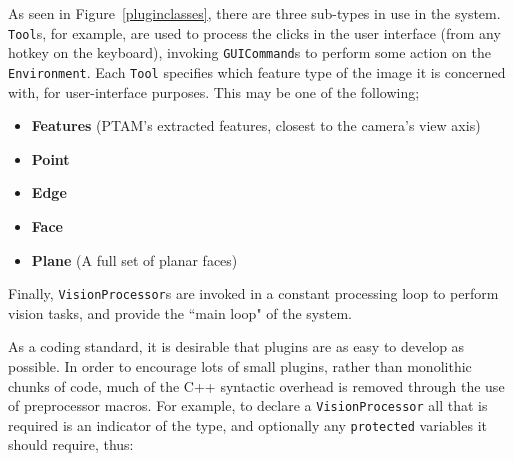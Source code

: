 \documentclass[a4paper,10pt]{article}
\begin{document}
As seen in Figure~\ref{pluginclasses}, there are three sub-types in use in the system. \texttt{Tool}s, for example, are used to process the clicks in the user interface (from any hotkey on the keyboard), invoking \texttt{GUICommand}s to perform some action on the \texttt{Environment}. Each \texttt{Tool} specifies which feature type of the image it is concerned with, for user-interface purposes. This may be one of the following;
\begin{itemize}
\item{\textbf{Features} (PTAM's extracted features, closest to the camera's view axis)}
\item{\textbf{Point}}
\item{\textbf{Edge}}
\item\textbf{{Face}}
\item{\textbf{Plane} (A full set of planar faces)}
\end{itemize}

Finally, \texttt{VisionProcessor}s are invoked in a constant processing loop to perform vision tasks, and provide the ``main loop" of the system.

As a coding standard, it is desirable that plugins are as easy to develop as possible. In order to encourage lots of small plugins, rather than monolithic chunks of code, much of the C++ syntactic overhead is removed through the use of preprocessor macros. For example, to declare a \texttt{VisionProcessor} all that is required is an indicator of the type, and optionally any \texttt{protected} variables it should require, thus:


\noindent
\ttfamily
\hlstd{}\hlstd{}\hlopt{(\ }\hlopt{,\ }\hlopt{;\ );}\\
\hlstd{}\hlopt{::}\hlstd{}\hlstd{}\hlopt{(\ }\hlopt{::}\hlopt{\usebox{\hlboxlessthan}}\hlopt{::}\hlopt{\usebox{\hlboxgreaterthan}\&\ }\hlopt{,\ }
\hlstd{\ \ \ \ }\hlstd{\ \ \ \ }\hlstd{\ \ \ \ }\hlopt{::}\hlopt{\usebox{\hlboxlessthan}\ }\hlopt{::}\hlopt{\usebox{\hlboxlessthan}}\hlopt{::}\hlopt{\usebox{\hlboxgreaterthan}\ \usebox{\hlboxgreaterthan}\&\ }\hlopt{)\ \usebox{\hlboxopenbrace}}\\
\hlstd{}\hlstd{\ \ \ \ }\hlstd{}\\
\hlstd{}\hlopt{\usebox{\hlboxclosebrace}}\hlstd{}\\
\mbox{}
\normalfont
\normalsize
\end{document}
